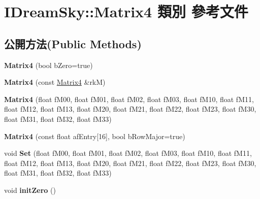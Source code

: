 \hypertarget{class_i_dream_sky_1_1_matrix4}{}\section{I\+Dream\+Sky\+:\+:Matrix4 類別 參考文件}
\label{class_i_dream_sky_1_1_matrix4}
\subsection*{公開方法(Public Methods)}
\begin{DoxyCompactItemize}
\item 
{\bfseries Matrix4} (bool b\+Zero=true)\hypertarget{class_i_dream_sky_1_1_matrix4_a26315b6caf81f70cc80e81c437b02594}{}\label{class_i_dream_sky_1_1_matrix4_a26315b6caf81f70cc80e81c437b02594}

\item 
{\bfseries Matrix4} (const \hyperlink{class_i_dream_sky_1_1_matrix4}{Matrix4} \&rkM)\hypertarget{class_i_dream_sky_1_1_matrix4_a683597bd69debd5661fbf58f9c302396}{}\label{class_i_dream_sky_1_1_matrix4_a683597bd69debd5661fbf58f9c302396}

\item 
{\bfseries Matrix4} (float f\+M00, float f\+M01, float f\+M02, float f\+M03, float f\+M10, float f\+M11, float f\+M12, float f\+M13, float f\+M20, float f\+M21, float f\+M22, float f\+M23, float f\+M30, float f\+M31, float f\+M32, float f\+M33)\hypertarget{class_i_dream_sky_1_1_matrix4_a0e89c088261cbe866cdb0037e8f35b40}{}\label{class_i_dream_sky_1_1_matrix4_a0e89c088261cbe866cdb0037e8f35b40}

\item 
{\bfseries Matrix4} (const float af\+Entry\mbox{[}16\mbox{]}, bool b\+Row\+Major=true)\hypertarget{class_i_dream_sky_1_1_matrix4_a30999f7417c03f5b721c9734a2224010}{}\label{class_i_dream_sky_1_1_matrix4_a30999f7417c03f5b721c9734a2224010}

\item 
void {\bfseries Set} (float f\+M00, float f\+M01, float f\+M02, float f\+M03, float f\+M10, float f\+M11, float f\+M12, float f\+M13, float f\+M20, float f\+M21, float f\+M22, float f\+M23, float f\+M30, float f\+M31, float f\+M32, float f\+M33)\hypertarget{class_i_dream_sky_1_1_matrix4_a3d2d1deed5482507a82f2ab29ad17127}{}\label{class_i_dream_sky_1_1_matrix4_a3d2d1deed5482507a82f2ab29ad17127}

\item 
void {\bfseries init\+Zero} ()\hypertarget{class_i_dream_sky_1_1_matrix4_a9c2ab42da4629ad979319e7e76be36c1}{}\label{class_i_dream_sky_1_1_matrix4_a9c2ab42da4629ad979319e7e76be36c1}


\end{DoxyCompactItemize}
